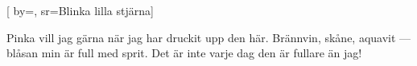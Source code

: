 [
    by={},
    sr={Blinka lilla stjärna}]

\beginverse
Pinka vill jag gärna när
jag har druckit upp den här.
Brännvin, skåne, aquavit ---
blåsan min är full med sprit.
Det är inte varje dag
den är fullare än jag!
\endverse
\endsong